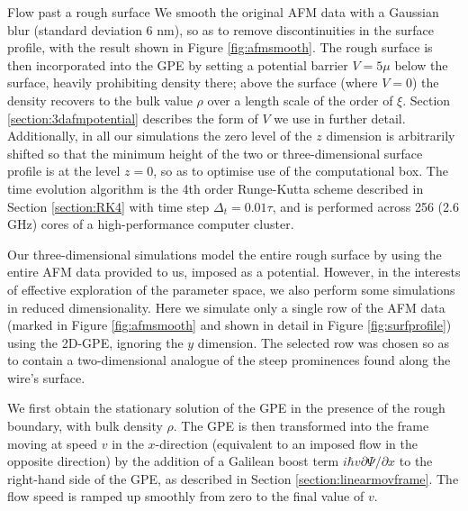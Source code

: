 \begin{chapter}{\label{cha:afm}Flow past a rough surface}
We smooth the original AFM data with a Gaussian blur (standard deviation 6 nm), so as to remove discontinuities in the surface profile, with the result shown in Figure \ref{fig:afmsmooth}. The rough surface is then incorporated into the GPE by setting a potential barrier $V=5\mu$ below the surface, heavily prohibiting density there; above the surface (where $V=0$) the density recovers to the bulk value $\rho$ over a length scale of the order of $\xi$. Section \ref{section:3dafmpotential} describes the form of $V$ we use in further detail. Additionally, in all our simulations the zero level of the $z$ dimension is arbitrarily shifted so that the minimum height of the two or three-dimensional surface profile is at the level $z=0$, so as to optimise use of the computational box. The time evolution algorithm is the 4th order Runge-Kutta scheme described in Section \ref{section:RK4} with time step $\Delta_t=0.01 \tau $, and is performed across 256 (2.6 GHz) cores of a high-performance {computer} cluster.

Our three-dimensional simulations model the entire rough surface by using the entire AFM data provided to us, imposed as a potential. However, in the interests of effective exploration of the parameter space, we also perform some simulations in reduced dimensionality. Here we simulate only a single row of the AFM data (marked in Figure \ref{fig:afmsmooth} and shown in detail in Figure \ref{fig:surfprofile}) using the 2D-GPE, ignoring the $y$ dimension. The selected row was chosen so as to contain a two-dimensional analogue of the steep prominences found along the wire's surface.

We first obtain the stationary solution of the GPE in the presence of
the rough boundary, with bulk density $\rho$.  The GPE is then transformed into the frame moving at speed $v$ in the $x$-direction (equivalent to an imposed flow in the opposite direction) by the addition of a Galilean boost term $ i \hbar v \partial \Psi/\partial x$ to the right-hand side of the GPE, as described in Section \ref{section:linearmovframe}.  The flow speed is ramped up smoothly from zero to the final value of $v$.


\end{chapter}
